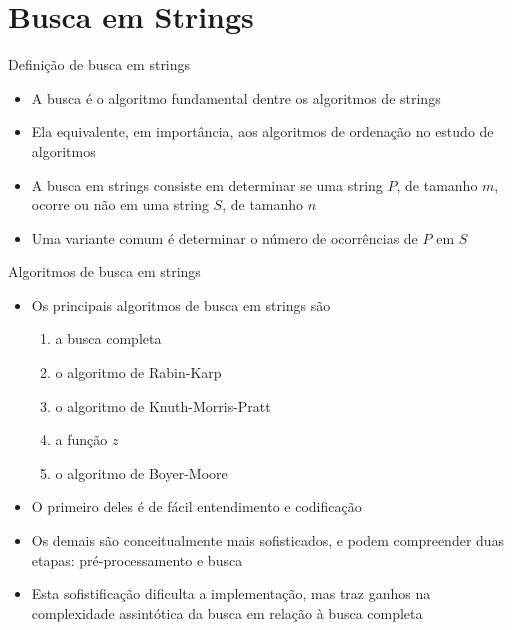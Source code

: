 \section{Busca em Strings}


\begin{frame}[fragile]{Definição de busca em strings}

    \begin{itemize}
        \item A busca é o algoritmo fundamental dentre os algoritmos de strings 
        \item Ela equivalente, em importância, aos algoritmos de ordenação no estudo de algoritmos
        \item A busca em strings consiste em determinar se uma string $P$, de tamanho $m$, ocorre 
            ou não em uma string $S$, de tamanho $n$
        \item Uma variante comum é determinar o número de ocorrências de $P$ em $S$
    \end{itemize}

\end{frame}

\begin{frame}[fragile]{Algoritmos de busca em strings}

    \begin{itemize}
        \item Os principais algoritmos de busca em strings são
        \begin{enumerate}
            \item a busca completa
            \item o algoritmo de Rabin-Karp
            \item o algoritmo de Knuth-Morris-Pratt
            \item a função $z$
            \item o algoritmo de Boyer-Moore
        \end{enumerate}

        \item O primeiro deles é de fácil entendimento e codificação

        \item Os demais são conceitualmente mais sofisticados, e podem compreender duas etapas:
            pré-processamento e busca

        \item Esta sofistificação dificulta a implementação, mas traz ganhos na complexidade
            assintótica da busca em relação à busca completa
    \end{itemize}

\end{frame}
